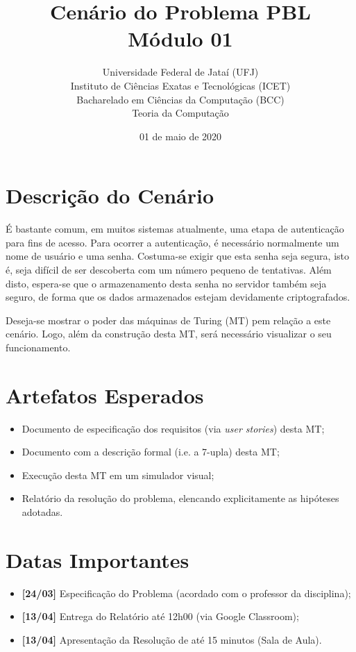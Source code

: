 \documentclass[a4paper, 11pt]{article}
\title{
	{\sc \Huge Cenário do Problema PBL \\Módulo 01}
}
\author{ 
	    Universidade Federal de Jataí (UFJ)\\
	    Instituto de Ciências Exatas e Tecnológicas (ICET)\\
	    Bacharelado em Ciências da Computação (BCC)\\
	    Teoria da Computação
	
}
\date{01 de maio de 2020}
\begin{document}
	
	\maketitle
	
	
	\section{Descrição do Cenário}
	
	É bastante comum, em muitos sistemas atualmente, uma etapa de autenticação para fins de acesso. Para ocorrer a autenticação, é necessário normalmente um nome de usuário e uma senha. Costuma-se exigir que esta senha seja segura, isto é, seja difícil de ser descoberta com um número pequeno de tentativas. Além disto, espera-se que o armazenamento desta senha no servidor também seja seguro, de forma que os dados armazenados estejam devidamente criptografados.
	
	Deseja-se mostrar o poder das máquinas de Turing (MT) pem relação a este cenário. Logo, além da construção desta MT, será necessário visualizar o seu funcionamento.
	
	\section{Artefatos Esperados}
	
	    \begin{itemize}
	        \item Documento de especificação dos requisitos (via {\it user stories}) desta MT;
	        \item Documento com a descrição formal (i.e. a 7-upla) desta MT;
	        \item Execução desta MT em um simulador visual;
	        \item Relatório da resolução do problema, elencando explicitamente as hipóteses adotadas.
	    \end{itemize}
	
	\section{Datas Importantes}
	
	\begin{itemize}
	    \item[] {\bf [24/03]} Especificação do Problema (a\-cordado com o professor da disciplina);
	    \item[] {\bf [13/04]} Entrega do Relatório até 12h00 (via Google Classroom);
	    \item[] {\bf [13/04]} Apresentação da Resolução de até 15 minutos (Sala de Aula).
	\end{itemize}
	
\end{document}
